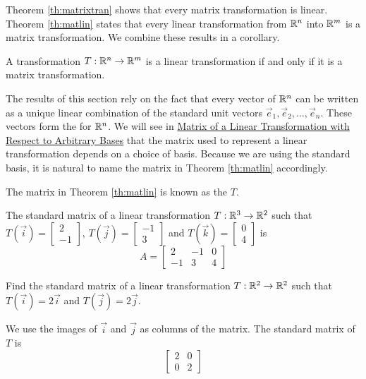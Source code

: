 \documentclass{ximera}
\begin{document}
Theorem \ref{th:matrixtran} shows that every matrix transformation is linear.  Theorem \ref{th:matlin} states that every linear transformation from $\mathbb{R}^n$ into $\mathbb{R}^m$ is a matrix transformation.  We combine these results in a corollary.

  \begin{corollary}\label{cor:lintransmattrans} A transformation $T:\mathbb{R}^n\rightarrow\mathbb{R}^m$ is a linear transformation if and only if it is a matrix transformation.
\end{corollary}  

The results of this section rely on the fact that every vector of $\mathbb{R}^n$ can be written as a unique linear combination of the standard unit vectors $\vec{e}_1,\vec{e}_2,\dots,\vec{e}_n$.  These vectors form the  for $\mathbb{R}^n$.  We will see in \href{https://ximera.osu.edu/oerlinalg/LinearAlgebra/LTR-0080/main}{Matrix of a Linear Transformation with Respect to Arbitrary Bases} that the matrix used to represent a linear transformation depends on a choice of basis.  Because we are using the standard basis, it is natural to name the matrix in Theorem \ref{th:matlin} accordingly.

\begin{definition} \label{def:standardmatoflintrans}
  The matrix in Theorem \ref{th:matlin} is known as the  $T$.
  \end{definition}

\begin{example}\label{ex:findmatrix2}
 The standard matrix of a linear transformation $T:\mathbb{R}^3\rightarrow \mathbb{R}^2$ such that $T(\vec{i})=\begin{bmatrix}2\\-1\end{bmatrix}$, $T(\vec{j})=\begin{bmatrix}-1\\3\end{bmatrix}$ and $T(\vec{k})=\begin{bmatrix}0\\4\end{bmatrix}$ is
 $$A=\begin{bmatrix}2&-1&0\\-1&3&4\end{bmatrix}$$
 \end{example}
 
 \begin{example}\label{ex:findmatrix}
Find the standard matrix of a linear transformation $T:\mathbb{R}^2\rightarrow \mathbb{R}^2$ such that $T(\vec{i})=2\vec{i}$ and $T(\vec{j})=2\vec{j}$.  
\begin{explanation}
We use the images of $\vec{i}$ and $\vec{j}$ as columns of the matrix.  The standard matrix of $T$ is
$$\begin{bmatrix}2&0\\0&2\end{bmatrix}$$
\end{explanation}
\end{example}
 
\end{document}

